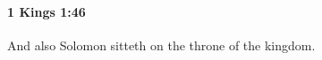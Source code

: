 
		\paragraph{1 Kings 1:46} %
			\label{1KINGS-1-46}

			And also Solomon sitteth on the throne of the kingdom.


